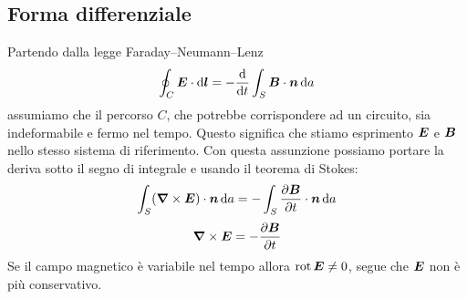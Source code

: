 \subsection{Forma differenziale}
Partendo dalla legge Faraday--Neumann--Lenz
\begin{equation}
  \oint_C\boldsymbol{E}\cdot\mathrm{d} \boldsymbol{l} = -\frac{\mathrm{d}}{\mathrm{d} t}\int_S\boldsymbol{B}\cdot\boldsymbol{n}\,\mathrm{d} a
\end{equation}
assumiamo che il percorso $C$, che potrebbe corrispondere ad un circuito, sia indeformabile e fermo nel tempo. Questo significa che stiamo esprimento $\boldsymbol{E}$ e $\boldsymbol{B}$ nello stesso sistema di riferimento. Con questa assunzione possiamo portare la deriva sotto il segno di integrale e usando il teorema di Stokes:
\begin{equation}
  \int_S(\boldsymbol{\nabla}\times\boldsymbol{E})\cdot\boldsymbol{n}\,\mathrm{d} a = -\int_S\frac{\partial\boldsymbol{B}}{\partial t}\cdot\boldsymbol{n}\,\mathrm{d} a
\end{equation}
\begin{equation}
  \boldsymbol{\nabla}\times\boldsymbol{E}=-\frac{\partial\boldsymbol{B}}{\partial t}
\end{equation}
Se il campo magnetico è variabile nel tempo allora $\operatorname{rot}\boldsymbol{E}\neq 0$, segue che $\boldsymbol{E}$ non è più conservativo.

